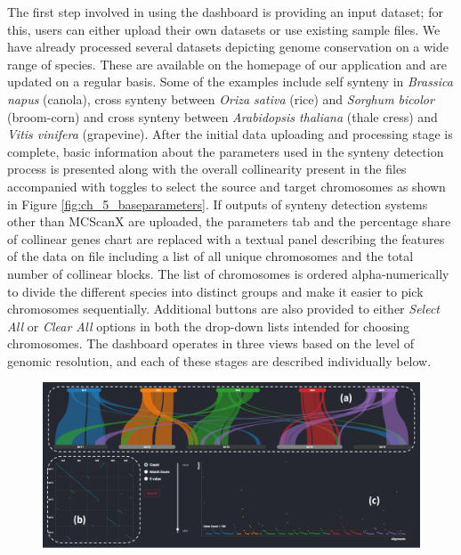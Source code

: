The first step involved in using the dashboard is providing an input dataset; for this, users can either upload their own datasets or use existing sample files. We have already processed several datasets depicting genome conservation on a wide range of species. These are available on the homepage of our application and are updated on a regular basis. Some of the examples include self synteny in \textit{Brassica napus} (canola), cross synteny between \textit{Oriza sativa} (rice) and \textit{Sorghum bicolor} (broom-corn) and cross synteny between \textit{Arabidopsis thaliana} (thale cress) and \textit{Vitis vinifera} (grapevine). After the initial data uploading and processing stage is complete, basic information about the parameters used in the synteny detection process is presented along with the overall collinearity present in the files accompanied with toggles to select the source and target chromosomes as shown in Figure \ref{fig:ch_5_baseparameters}. If outputs of synteny detection systems other than MCScanX are uploaded, the parameters tab and the percentage share of collinear genes chart are replaced with a textual panel describing the features of the data on file including a list of all unique chromosomes and the total number of collinear blocks. The list of chromosomes is ordered alpha-numerically to divide the different species into distinct groups and make it easier to pick chromosomes sequentially. Additional buttons are also provided to either \textit{Select All} or \textit{Clear All} options in both the drop-down lists intended for choosing chromosomes. The dashboard operates in three views based on the level of genomic resolution, and each of these stages are described individually below.

\begin{figure}
  \centering
  \includegraphics[width=1\linewidth]{images/ch_1_dashboard.PNG}
  \label{fig:ch_4_dashboard}
\end{figure} 

